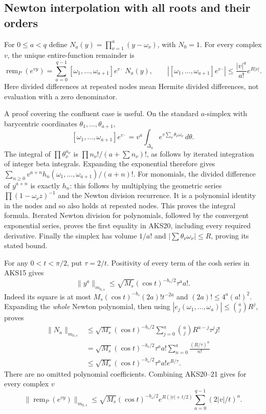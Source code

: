 \documentclass[11pt,a4paper]{article}
\begin{document}
\subsection{Newton interpolation with all roots and their orders}
For $0\le a<q$ define $N_a(y)=\prod_{\nu=1}^a(y-\omega_\nu)$, with
$N_0=1$. For every complex $v$, the unique entire-function remainder is
\[
 \operatorname{rem}_P(e^{vy})
   =\sum_{a=0}^{q-1}[\omega_1,\ldots,\omega_{a+1}]e^{v\cdot}\ N_a(y),
 \qquad
 \left|[\omega_1,\ldots,\omega_{a+1}]e^{v\cdot}\right|
       \le\frac{|v|^a}{a!}e^{R|v|}.
 \tag{AKS20}
\]
Here divided differences at repeated nodes mean Hermite divided
differences, not evaluation with a zero denominator.

A proof covering the confluent case is useful. On the standard
$a$-simplex with barycentric coordinates $\theta_1,\ldots,\theta_{a+1}$,
\[
 [\omega_1,\ldots,\omega_{a+1}]e^{v\cdot}
       =v^a\int_{\Delta_a}e^{v\sum_\nu\theta_\nu\omega_\nu}\,d\theta.
\]
The integral of $\prod\theta_\nu^{n_\nu}$ is
$\prod n_\nu!/(a+\sum n_\nu)!$, as follows by iterated integration of
integer beta integrals. Expanding the exponential therefore gives
$\sum_{n\ge0}v^{a+n}h_n(\omega_1,\ldots,\omega_{a+1})/(a+n)!$.
For monomials, the divided difference of $y^{a+n}$ is exactly $h_n$:
this follows by multiplying the geometric series
$\prod(1-\omega_\nu z)^{-1}$ and the Newton division recurrence.
It is a polynomial identity in the nodes and so also holds at repeated
nodes. This proves the integral formula. Iterated Newton division for
polynomials, followed by the convergent exponential series, proves the
first equality in AKS20, including every required derivative.
Finally the simplex has volume $1/a!$ and
$|\sum\theta_\nu\omega_\nu|\le R$, proving its stated bound.

For any $0<t<\pi/2$, put $\tau=2/t$. Positivity of every term of the
cosh series in AKS15 gives
\[
 \|y^a\|_{m_{0,s}}
 \le\sqrt{M_s}(\cos t)^{-b_s/2}\tau^a a!.
\]
Indeed its square is at most
$M_s(\cos t)^{-b_s}(2a)!t^{-2a}$ and
$(2a)!\le4^a(a!)^2$. Expanding the \emph{whole} Newton polynomial, then
using $|e_j(\omega_1,\ldots,\omega_a)|\le\binom ajR^j$, proves
\[
\begin{split}
 \|N_a\|_{m_{0,s}}
 &\le\sqrt{M_s}(\cos t)^{-b_s/2}
        \sum_{j=0}^a\binom ajR^{a-j}\tau^j j!\\
 &=\sqrt{M_s}(\cos t)^{-b_s/2}\tau^a a!
           \sum_{n=0}^a\frac{(R/\tau)^n}{n!}\\
 &\le\sqrt{M_s}(\cos t)^{-b_s/2}\tau^a a!e^{R/\tau}.
\end{split}\tag{AKS21}
\]
There are no omitted polynomial coefficients. Combining AKS20--21 gives
for every complex $v$
\[
 \|\operatorname{rem}_P(e^{vy})\|_{m_{0,s}}
 \le\sqrt{M_s}(\cos t)^{-b_s/2}e^{R(|v|+t/2)}
                       \sum_{a=0}^{q-1}(2|v|/t)^a.
 \tag{AKS22}
\]
\end{document}
